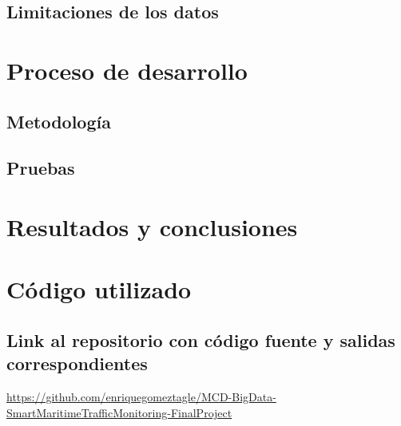 \documentclass[10pt]{article}
\begin{document}
\subsection{Limitaciones de los datos} %
\section{Proceso de desarrollo}
\subsection{Metodología} %
\subsection{Pruebas} %
\section{Resultados y conclusiones} %
\section{Código utilizado} %
\subsection{Link al repositorio con código fuente y salidas correspondientes}
\url{https://github.com/enriquegomeztagle/MCD-BigData-SmartMaritimeTrafficMonitoring-FinalProject}
\end{document}
